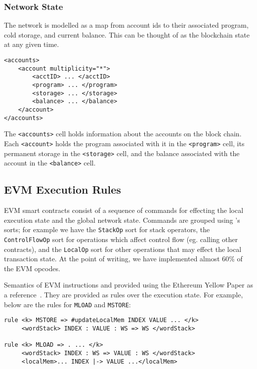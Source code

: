 \subsubsection{Network State}

The network is modelled as a map from account ids to their associated program,
cold storage, and current balance. This can be thought of as the blockchain
state at any given time.

\begin{verbatim}
<accounts>
    <account multiplicity="*">
        <acctID> ... </acctID>
        <program> ... </program>
        <storage> ... </storage>
        <balance> ... </balance>
    </account>
</accounts>
\end{verbatim}

The \texttt{<accounts>} cell holds information about the accounts on the block
chain. Each \texttt{<account>} holds the program associated with it in the
\texttt{<program>} cell, its permanent storage in the \texttt{<storage>} cell,
and the balance associated with the account in the \texttt{<balance>} cell.

\subsection{EVM Execution Rules}

EVM smart contracts consist of a sequence of commands for effecting the local
execution state and the global network state. Commands are grouped using \K's
sorts; for example we have the \texttt{StackOp} sort for stack operators, the
\texttt{ControlFlowOp} sort for operations which affect control flow (eg.
calling other contracts), and the \texttt{LocalOp} sort for other operations
that may effect the local transaction state. At the point of writing, we have
implemented almost 60\% of the EVM opcodes.

Semantics of EVM instructions and provided using the Ethereum Yellow Paper as a
reference~\cite{wood2014ethereum}. They are provided as \K rules over the
execution state. For example, below are the rules for \texttt{MLOAD} and
\texttt{MSTORE}:

\begin{verbatim}
rule <k> MSTORE => #updateLocalMem INDEX VALUE ... </k>
     <wordStack> INDEX : VALUE : WS => WS </wordStack>

rule <k> MLOAD => . ... </k>
     <wordStack> INDEX : WS => VALUE : WS </wordStack>
     <localMem>... INDEX |-> VALUE ...</localMem>
\end{verbatim}

